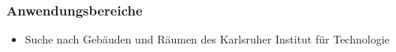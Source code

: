 \subsubsection{Anwendungsbereiche}

\begin{itemize}
	\item Suche nach Gebäuden und Räumen des Karlsruher Institut für Technologie
\end{itemize}